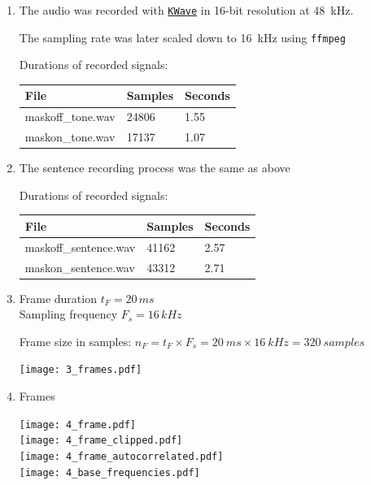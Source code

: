 \documentclass[a4paper, 11pt]{article}
\begin{document}
    \begin{enumerate}
        \item
        The audio was recorded with \texttt{\href{https://apps.kde.org/en/kwave}{KWave}} in 16-bit resolution at 48~kHz.

        The sampling rate was later scaled down to 16~kHz using \texttt{ffmpeg}

        Durations of recorded signals: \\
        \begin{tabular}{ | l | l | l | }
            \hline
            \textbf{File}     & \textbf{Samples} & \textbf{Seconds} \\ \hline
            maskoff\_tone.wav & 24806            & 1.55             \\ \hline
            maskon\_tone.wav  & 17137            & 1.07             \\ \hline
        \end{tabular}

        \item
        The sentence recording process was the same as above

        Durations of recorded signals: \\
        \begin{tabular}{ | l | l | l | }
            \hline
            \textbf{File}         & \textbf{Samples} & \textbf{Seconds} \\ \hline
            maskoff\_sentence.wav & 41162            & 2.57             \\ \hline
            maskon\_sentence.wav  & 43312            & 2.71             \\ \hline
        \end{tabular}

        \newpage
        \item
        Frame duration $t_F = 20\,ms$ \\
        Sampling frequency $F_s = 16\,kHz$

        Frame size in samples: $n_F = t_F \times F_s = 20~ms \times 16~kHz = 320~samples$

        \texttt{[image: 3\_frames.pdf]}

        \item
        Frames

        \texttt{[image: 4\_frame.pdf]} \\
        \texttt{[image: 4\_frame\_clipped.pdf]} \\
        \texttt{[image: 4\_frame\_autocorrelated.pdf]} \\
        \texttt{[image: 4\_base\_frequencies.pdf]}


\end{enumerate}
\end{document}
